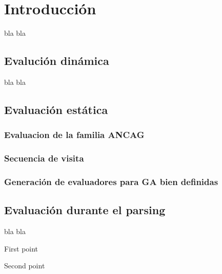 \chapter{Introducci\'on}
\label{chap:met_eval}
\minitoc


bla bla

\section{Evaluci\'on din\'amica}

bla bla

\section{Evaluaci\'on est\'atica}

\subsection{Evaluacion de la familia ANCAG}
\subsection{Secuencia de visita}
\subsection{Generaci\'on de evaluadores para GA bien definidas}
\section{Evaluaci\'on durante el parsing}

bla bla

\begin{bulletList}
 \item First point
 \item Second point
\end{bulletList}
